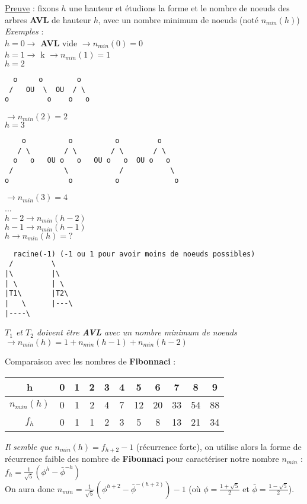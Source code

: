 \documentclass{article}
\begin{document}
\noindent\underline{Preuve} : fixons $h$ une hauteur et étudions la forme et le nombre de noeuds des arbres 
\textbf{AVL} de hauteur $h$, avec un nombre minimum de noeuds (noté $n_{min}(h)$)\\
\textit{Exemples} : \\
$h = 0 \rightarrow$ \textbf{AVL} vide $\rightarrow n_{min}(0) = 0$ \\
$h = 1 \rightarrow$ k $\rightarrow n_{min}(1) = 1$ \\
$h = 2$
\begin{lstlisting}
  o     o        o
 /   OU  \  OU  / \
o         o    o   o
\end{lstlisting}
$\rightarrow n_{min}(2) = 2$\\
$h = 3$
\begin{lstlisting}
    o          o          o         o
   / \        / \        / \       / \
  o   o   OU o   o   OU o   o  OU o   o
 /            \            /           \
o              o          o             o 
\end{lstlisting}
$\rightarrow n_{min}(3) = 4$\\
...\\
$h-2 \rightarrow n_{min}(h-2)$ \\
$h-1 \rightarrow n_{min}(h-1)$ \\
$h \rightarrow n_{min}(h) = ?$ \\

\newpage

\begin{lstlisting}
  racine(-1) (-1 ou 1 pour avoir moins de noeuds possibles)
 /         \
|\         |\
| \        | \
|T1\       |T2\
|   \      |---\
|----\
\end{lstlisting}
\textit{$T_1$ et $T_2$ doivent être \textbf{AVL} avec un nombre minimum de noeuds $\rightarrow n_{min}(h) = 
1+n_{min}(h-1)+n_{min}(h-2)$}

\noindent Comparaison avec les nombres de \textbf{Fibonnaci} : 
\begin{center}
	\begin{tabular}{|*{11}{c|}}
	\hline
	h & 0 & 1 & 2 & 3 & 4 & 5 & 6 & 7 & 8 & 9 \\
	\hline
	$n_{min}(h)$ & 0 & 1 & 2 & 4 & 7 & 12 & 20 & 33 & 54 & 88 \\
	\hline
	$f_h$ & 0 & 1 & 1 & 2 & 3 & 5 & 8 & 13 & 21 & 34\\
	\hline
	\end{tabular}
\end{center}
\textit{Il semble que $n_{min}(h) = f_{h+2} - 1$} (récurrence forte), on utilise alors la forme de récurrence 
faible des nombre de \textbf{Fibonnaci} pour caractériser notre nombre $n_{min}$ : $f_h = \frac{1}
{\sqrt{5}}\left(\phi^h-\bar{\phi}^{-h}\right)$ \\ 
On aura donc $n_{min} = \frac{1}{\sqrt{5}}\left(\phi^{h+2}-\bar{\phi}^{-(h+2)}\right) - 1$ (où $\phi = 
\frac{1+\sqrt{5}}{2}$ et $\bar{\phi} = \frac{1-\sqrt{5}}{2}$). \\
\end{document}
